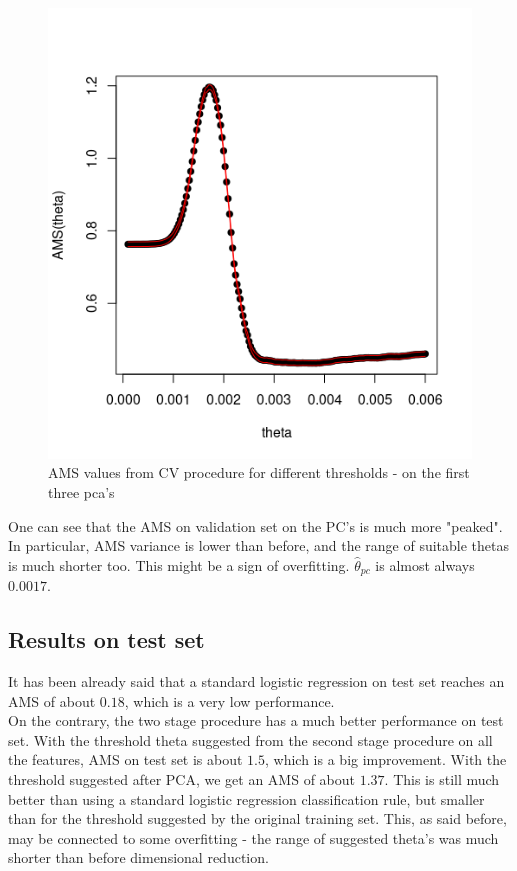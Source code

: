 \documentclass[]{article}
\begin{document}
\begin{figure}[H]
\centering
\label{fig: tuned_pca}
\includegraphics[scale=0.6]{../Pictures/trainpcatunedtheta.png}
\caption{AMS values from CV procedure for different thresholds - on the first three pca's}
\end{figure}

One can see that the AMS on validation set on the PC's is much more "peaked". In particular, AMS variance is lower than before, and the range of suitable thetas is much shorter too. This might be a sign of overfitting. $\hat{\theta}_{pc}$ is almost always $0.0017$.

\subsection{Results on test set}

It has been already said that a standard logistic regression on test set reaches an AMS of about $0.18$, which is a very low performance. \\

On the contrary, the two stage procedure has a much better performance on test set. With the threshold theta suggested from the second stage procedure on all the features, AMS on test set is about $1.5$, which is a big improvement. With the threshold suggested after PCA, we get an AMS of about $1.37$. This is still much better than using a standard logistic regression classification rule, but smaller than for the threshold suggested by the original training set. This, as said before, may be connected to some overfitting - the range of suggested theta's was much shorter than before dimensional reduction.\\
\end{document}
